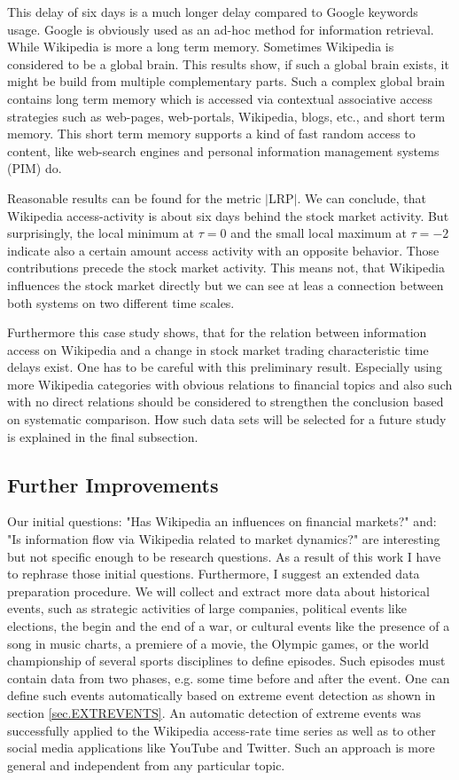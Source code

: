 \documentclass[a4paper,10pt]{scrbook}
\begin{document}
This delay of six days is a much longer delay compared to Google keywords usage. Google is obviously used as an ad-hoc method for information retrieval. While Wikipedia is more a long term memory. Sometimes Wikipedia is considered to be a global brain. This results show, if such a global brain exists, it might be build from multiple complementary parts. Such a complex global brain contains long term memory which is accessed via contextual associative access strategies such as web-pages, web-portals, Wikipedia, blogs, etc., and short term memory. This short term memory supports a kind of fast random access to content, like web-search engines and personal information management systems (PIM) do.

Reasonable results can be found for the metric $\vert$LRP$\vert$. We can conclude, that Wikipedia access-activity is about six days behind the stock market activity. But surprisingly, the local minimum at $\tau = 0$ and the small local maximum at $\tau = -2$ indicate also a certain amount access activity with an opposite behavior. Those contributions precede the stock market activity. This means not, that Wikipedia influences the stock market directly but we can see at leas a connection between both systems on two different time scales. 

Furthermore this case study shows, that for the relation between information access on Wikipedia and a change in stock market trading characteristic time delays exist. One has to be careful with this preliminary result. Especially using more Wikipedia categories with obvious relations to financial topics and also such with no direct relations should be considered 
to strengthen the conclusion based on systematic comparison. How such data sets will be selected for a future study is explained in the final subsection. 

%
%

\subsection{Further Improvements}
Our initial questions: "Has Wikipedia an influences on financial markets?" and: "Is information flow via Wikipedia related to market dynamics?" are interesting but not specific enough to be research questions. As a result of this work I have to rephrase those initial questions. Furthermore, I suggest an extended data preparation procedure. We will collect and extract more data about historical events, such as strategic activities of large companies, political events like elections, the begin and the end of a war, or cultural events like the presence of a song in music charts, a premiere of a movie, the Olympic games, or the world championship of several sports disciplines to define episodes. Such episodes must contain data from two phases, e.g. some time before and after the event. One can define such events automatically based on extreme event detection as shown in section \ref{sec.EXTREVENTS}. An automatic detection of extreme events was successfully applied to the Wikipedia access-rate time series as well as to other social media applications like YouTube and Twitter. Such an approach is more general and independent from any particular topic.
\end{document}
